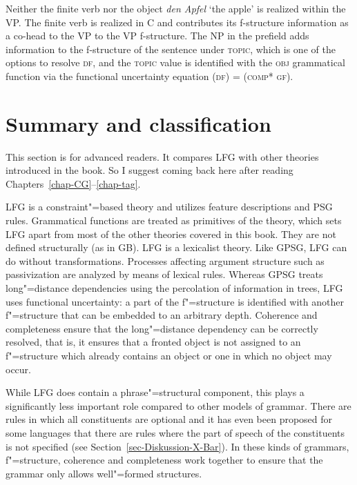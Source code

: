 Neither the finite verb nor the object \emph{den Apfel} `the apple' is realized within the VP. The
finite verb is realized in C and contributes its f-structure information as a co-head to the VP to
the VP f-structure. The NP in the prefield adds information to the f-structure of the sentence under
\textsc{topic}, which is one of the options to resolve \textsc{df}, and the \textsc{topic} value is identified with the \textsc{obj} grammatical function
via the functional uncertainty equation (\upsp \textsc{df}) = (\upsp \textsc{comp* gf}).



\section{Summary and classification}

This section is for advanced readers. It compares LFG with other theories introduced in the book. So
I suggest coming back here after reading Chapters~\ref{chap-CG}--\ref{chap-tag}.

LFG is a constraint"=based theory and utilizes feature descriptions and PSG rules. Grammatical functions are treated
as primitives of the theory, which sets LFG apart from most of the other theories covered in this book. They are not defined structurally (as in GB). LFG is a lexicalist theory. Like GPSG, LFG can do without transformations. Processes affecting
argument structure such as passivization are analyzed by means of lexical rules. Whereas GPSG treats long"=distance dependencies using the percolation of information
in trees, LFG uses functional uncertainty: a part of the f"=structure is identified with another
f"=structure that can be embedded to an arbitrary depth. Coherence and completeness
ensure that the long"=distance dependency can be correctly resolved, that is, it ensures that a fronted object is not assigned to an f"=structure which already contains an object or one
in which no object may occur.

While LFG does contain a phrase"=structural component, this plays a significantly less important role compared to other models of grammar. There are rules in which all constituents are
optional and it has even been proposed for some languages that there are rules where the part of speech of the constituents is not specified (see Section~\ref{sec-Diskussion-X-Bar}).
In these kinds of grammars, f"=structure, coherence and completeness work together to ensure that the grammar only allows well"=formed structures.

